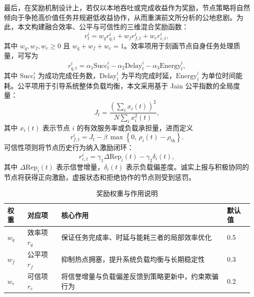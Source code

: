 最后，在奖励机制设计上，若仅以本地吞吐或完成收益作为奖励，节点策略将自然倾向于争抢高价值任务并规避低收益协作，从而重演前文所分析的公地悲剧。为此，本文构建融合效率、公平与可信性的三维混合奖励函数：
\begin{equation}
  r_t^i = w_q r_{q,t}^i + w_f r_{f,t}^i + w_c r_{c,t}^i,
  \label{eq:hybrid_reward}
\end{equation}
其中 $w_q,w_f,w_c\ge 0$ 且 $w_q+w_f+w_c=1$。效率项用于刻画节点自身任务处理质量，可写为
\begin{equation}
  r_{q,t}^i = \alpha_1\mathrm{Succ}_t^i - \alpha_2\mathrm{Delay}_t^i - \alpha_3\mathrm{Energy}_t^i,
  \label{eq:rq}
\end{equation}
其中 $\mathrm{Succ}_t^i$ 为成功完成任务数，$\mathrm{Delay}_t^i$ 为平均完成时延，$\mathrm{Energy}_t^i$ 为单位时间能耗。公平项用于引导系统整体负载均衡，本文采用基于 Jain 公平指数的全局度量\cite{ref6}：
\begin{equation}
  J_t = \frac{\left(\sum_i x_i(t)\right)^2}{N\sum_i x_i^2(t)},
  \label{eq:jain}
\end{equation}
其中 $x_i(t)$ 表示节点 $i$ 的有效服务率或负载承担量，进而定义
\begin{equation}
  r_{f,t}^i = J_t - \beta\,\max\left\{0,\,\rho_i(t)-\rho_{\mathrm{th}}\right\}.
  \label{eq:rf}
\end{equation}
可信性项则将节点历史行为纳入激励闭环：
\begin{equation}
  r_{c,t}^i = \gamma_1 \Delta \mathrm{Rep}_i(t) - \gamma_2 \delta_i(t),
  \label{eq:rc}
\end{equation}
其中 $\Delta \mathrm{Rep}_i(t)$ 表示信誉增量，$\delta_i(t)$ 表示负载偏差度。诚实上报与积极协同的节点将获得正向激励，虚报状态和拒绝协作的节点则受到惩罚。

\begin{table}[htbp]
\centering
\caption{奖励权重与作用说明}
\label{tab:reward_weight}
\begin{tabularx}{\textwidth}{P{1.8cm}P{2.2cm}Y P{1.5cm}}
\toprule
权重 & 对应项 & 核心作用 & 默认值 \\
\midrule
$w_q$ & 效率项 $r_q$ & 保证任务完成率、时延与能耗三者的局部效率优化 & 0.5 \\
$w_f$ & 公平项 $r_f$ & 抑制热点拥塞，提升系统负载均衡与长期稳定性 & 0.3 \\
$w_c$ & 可信项 $r_c$ & 将信誉增量与负载偏差反馈到策略更新中，约束欺骗行为 & 0.2 \\
\bottomrule
\end{tabularx}
\end{table}

